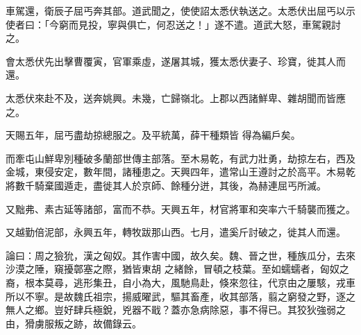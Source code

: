\begin{pinyinscope}
 車駕還，衛辰子屈丐奔其部。道武聞之，使使詔太悉伏執送之。太悉伏出屈丐以示使者曰：「今窮而見投，寧與俱亡，何忍送之！」遂不遣。道武大怒，車駕親討之。



 會太悉伏先出擊曹覆寅，官軍乘虛，遂屠其城，獲太悉伏妻子、珍寶，徙其人而還。



 太悉伏來赴不及，送奔姚興。未幾，亡歸嶺北。上郡以西諸鮮卑、雜胡聞而皆應之。



 天賜五年，屈丐盡劫掠總服之。及平統萬，薛干種類皆
 得為編戶矣。



 而牽屯山鮮卑別種破多蘭部世傳主部落。至木易乾，有武力壯勇，劫掠左右，西及金城，東侵安定，數年間，諸種患之。天興四年，遣常山王遵討之於高平。木易乾將數千騎棄國遁走，盡徙其人於京師、餘種分迸，其後，為赫連屈丐所滅。



 又黜弗、素古延等諸部，富而不恭。天興五年，材官將軍和突率六千騎襲而獲之。



 又越勤倍泥部，永興五年，轉牧跋那山西。七月，遣奚斤討破之，徙其人而還。



 論曰：周之獫狁，漢之匈奴。其作害中國，故久矣。魏、晉之世，種族瓜分，去來沙漠之陲，窺擾鄣塞之際，猶皆東胡
 之緒餘，冒頓之枝葉。至如蠕蠕者，匈奴之裔，根本莫尋，逃形集丑，自小為大，風馳鳥赴，倏來忽往，代京由之屢駭，戎車所以不寧。是故魏氏祖宗，揚威曜武，驅其畜產，收其部落，翦之窮發之野，逐之無人之鄉。豈好肆兵極銳，兇器不戢？蓋亦急病除惡，事不得已。其狡狄強弱之由，猾虜服叛之跡，故備錄云。



\end{pinyinscope}